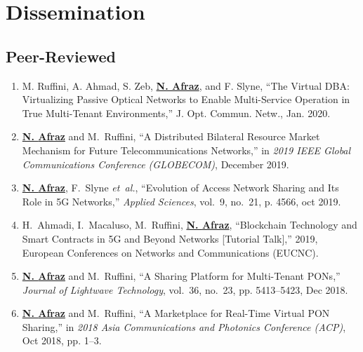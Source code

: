 \section{Dissemination}
% 
\nobibliography*

\subsection{Peer-Reviewed}

 \begin{enumerate}
    \item M. Ruffini, A. Ahmad, S. Zeb, \textbf{\underline{N. {Afraz}}}, and F. Slyne, “The Virtual DBA: Virtualizing Passive Optical Networks to Enable Multi-Service Operation in True Multi-Tenant Environments,” J. Opt. Commun. Netw., Jan. 2020.
    
    \item  \textbf{\underline{N. {Afraz}}} and M.~{Ruffini}, ``A Distributed Bilateral Resource Market Mechanism for Future Telecommunications Networks,'' in \emph{2019 IEEE Global Communications Conference (GLOBECOM)}, December 2019.

    \item \textbf{\underline{N. {Afraz}}}, F.~Slyne \emph{et~al.}, ``Evolution of Access Network Sharing and Its Role in 5G Networks,'' \emph{Applied Sciences}, vol.~9, no.~21, p. 4566, oct 2019.

    \item H.~Ahmadi, I.~Macaluso, M.~{Ruffini}, \textbf{\underline{N. {Afraz}}}, ``Blockchain Technology and Smart Contracts in 5G and Beyond Networks [Tutorial Talk],'' 2019, European Conferences on Networks and Communications (EUCNC).

    \item \textbf{\underline{N. {Afraz}}} and M.~{Ruffini}, ``A Sharing Platform for Multi-Tenant PONs,'' \emph{Journal of Lightwave Technology}, vol.~36, no.~23, pp. 5413--5423, Dec 2018.

    \item \textbf{\underline{N. {Afraz}}} and M.~{Ruffini}, ``A Marketplace for Real-Time Virtual PON Sharing,'' in \emph{2018 Asia Communications and Photonics Conference (ACP)}, Oct 2018, pp. 1--3.


\end{enumerate}
